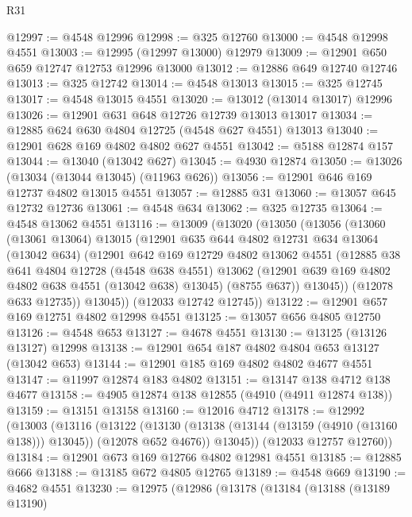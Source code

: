 \begin{lexlean}{R31}
\begin{coremodule}
@12997 := @4548 @12996
@12998 := @325 @12760
@13000 := @4548 @12998 @4551
@13003 := @12995 (@12997 @13000) @12979
@13009 := @12901 @650 @659 @12747 @12753 @12996 @13000
@13012 := @12886 @649 @12740 @12746
@13013 := @325 @12742
@13014 := @4548 @13013
@13015 := @325 @12745
@13017 := @4548 @13015 @4551
@13020 := @13012 (@13014 @13017) @12996
@13026 := @12901 @631 @648 @12726 @12739 @13013 @13017
@13034 := @12885 @624 @630 @4804 @12725 (@4548 @627 @4551) @13013
@13040 := @12901 @628 @169 @4802 @4802 @627 @4551
@13042 := @5188 @12874 @157
@13044 := @13040 (@13042 @627)
@13045 := @4930 @12874
@13050 := @13026 (@13034 (@13044 @13045) (@11963 @626))
@13056 := @12901 @646 @169 @12737 @4802 @13015 @4551
@13057 := @12885 @31
@13060 := @13057 @645 @12732 @12736
@13061 := @4548 @634
@13062 := @325 @12735
@13064 := @4548 @13062 @4551
@13116 := @13009
    (@13020
      (@13050
        (@13056
          (@13060
            (@13061 @13064)
            @13015
            (@12901
              @635
              @644
              @4802
              @12731
              @634
              @13064
              (@13042 @634)
              (@12901
                @642
                @169
                @12729
                @4802
                @13062
                @4551
                (@12885
                  @38
                  @641
                  @4804
                  @12728
                  (@4548 @638 @4551)
                  @13062
                  (@12901 @639 @169 @4802 @4802 @638 @4551 (@13042 @638) @13045)
                  (@8755 @637))
                @13045))
            (@12078 @633 @12735))
          @13045))
      (@12033 @12742 @12745))
@13122 := @12901 @657 @169 @12751 @4802 @12998 @4551
@13125 := @13057 @656 @4805 @12750
@13126 := @4548 @653
@13127 := @4678 @4551
@13130 := @13125 (@13126 @13127) @12998
@13138 := @12901 @654 @187 @4802 @4804 @653 @13127 (@13042 @653)
@13144 := @12901 @185 @169 @4802 @4802 @4677 @4551
@13147 := @11997 @12874 @183 @4802
@13151 := @13147 @138 @4712 @138 @4677
@13158 := @4905 @12874 @138 @12855 (@4910 (@4911 @12874 @138))
@13159 := @13151 @13158
@13160 := @12016 @4712
@13178 := @12992
    (@13003
      (@13116
        (@13122
          (@13130 (@13138 (@13144 (@13159 (@4910 (@13160 @138))) @13045)) (@12078 @652 @4676))
          @13045))
      (@12033 @12757 @12760))
@13184 := @12901 @673 @169 @12766 @4802 @12981 @4551
@13185 := @12885 @666
@13188 := @13185 @672 @4805 @12765
@13189 := @4548 @669
@13190 := @4682 @4551
@13230 := @12975
    (@12986
      (@13178
        (@13184
          (@13188
            (@13189 @13190)

\end{coremodule}
\end{lexlean}
